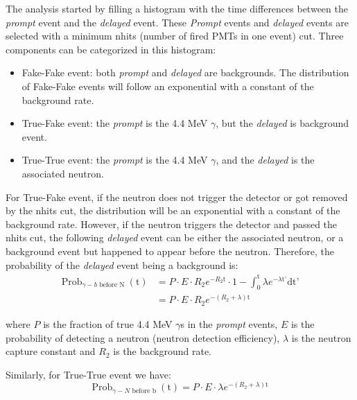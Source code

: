 \documentclass[a4paper]{jpconf}
\begin{document}
The analysis started by filling a histogram with the time differences between the \textit{prompt} event and the \textit{delayed} event. These \textit{Prompt} events and \textit{delayed} events are selected with a minimum nhits (number of fired PMTs in one event) cut. Three components can be categorized in this histogram:

\begin{itemize}
\item Fake-Fake event: both \textit{prompt} and \textit{delayed} are backgrounds. The distribution of Fake-Fake events will follow an exponential with a constant of the background rate.
\item True-Fake event: the \textit{prompt} is the 4.4 MeV $\gamma$, but the \textit{delayed} is background event.
\item True-True event: the \textit{prompt} is the 4.4 MeV $\gamma$, and the \textit{delayed} is the associated neutron. 
\end{itemize}

For True-Fake event, if the neutron does not trigger the detector or got removed by the nhits cut, the distribution will be an exponential with a constant of the background rate. However, if the neutron triggers the detector and passed the nhits cut, the following \textit{delayed} event can be either the associated neutron, or a background event but happened to appear before the neutron. Therefore, the probability of the \textit{delayed} event being a background is:
\begin{equation}
\begin{aligned}
\textrm{Prob}_{\gamma - b\textrm{ before N }}(\textrm{t}) & = P \cdot E \cdot R_{2} e^{-R_{2}\textrm{t}} \cdot 1- \int_0^{\textrm{t}} \lambda e^{-\lambda \textrm{t'}}\textrm{dt'} \\
& = P \cdot E \cdot R_{2} e^{-(R_{2}+\lambda)\textrm{t}}
\end{aligned}
\end{equation}

where $P$ is the fraction of true 4.4 MeV $\gamma$s in the \textit{prompt} events, $E$ is the probability of detecting a neutron (neutron detection efficiency), $\lambda$ is the neutron capture constant and $R_2$ is the background rate.

Similarly, for True-True event we have:
\begin{equation}
\textrm{Prob}_{\gamma - N\textrm{ before b }}(\textrm{t}) = P \cdot E \cdot \lambda e^{-(R_{2}+\lambda)\textrm{t}}
\end{equation}
\end{document}
